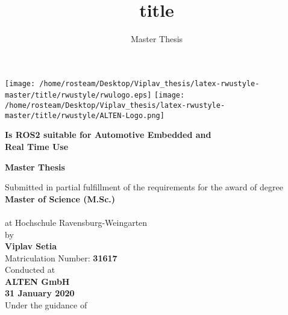 \documentclass{scrartcl}
\title{title}
\subtitle{Master Thesis}
\begin{document}
\texttt{[image: /home/rosteam/Desktop/Viplav\_thesis/latex-rwustyle-master/title/rwustyle/rwulogo.eps]}
\hspace*{2cm}
\texttt{[image: /home/rosteam/Desktop/Viplav\_thesis/latex-rwustyle-master/title/rwustyle/ALTEN-Logo.png]}
\begin{center}
\vspace*{1.5cm}	{\color{rwuviolet}\huge\normalfont\bfseries Is ROS2 suitable for Automotive Embedded and \\ \vspace*{2mm}Real Time Use}

\vspace*{5mm}	{\color{rwucyan}\Large\normalfont\bfseries Master Thesis}

\vspace*{6mm}	Submitted in partial fulfillment of the requirements for the award of degree\\
\vspace*{3mm} {\large\normalfont\bfseries Master of Science (M.Sc.)}\\
	  \vspace*{3mm}{ in \large\bfseries Mechatronics}	\\
	  \vspace*{3mm} at Hochschule Ravensburg-Weingarten\\
\vspace*{3mm}	by\\
	  \vspace*{2mm} {\large\normalfont\bfseries Viplav Setia}\\
	  \vspace*{2mm} {\large Matriculation Number: \bfseries 31617}\\
	  
	  \vspace*{4mm} {Conducted at}\\
	  \vspace*{3mm} {\large\normalfont\bfseries ALTEN GmbH}\\
	  \vspace*{4mm}	{\large\normalfont\bfseries 31 January 2020}\\
	  \vspace*{7mm}	Under the guidance of\\
	  

\end{center}
\end{document}
